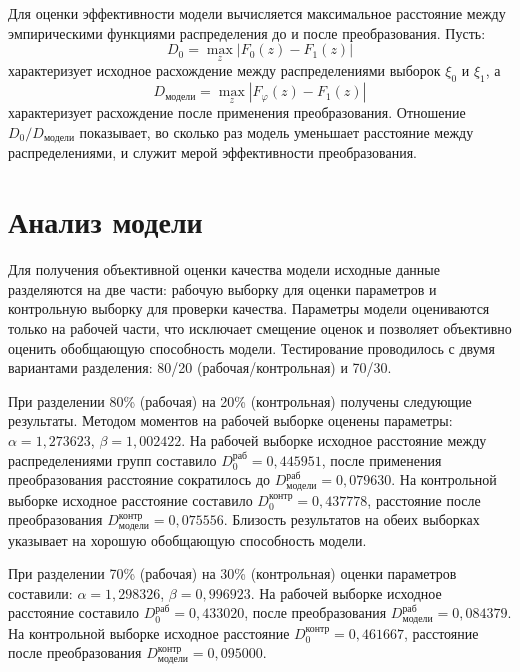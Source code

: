 \documentclass[a4paper, 14pt]{extarticle}
\begin{document}
Для оценки эффективности модели вычисляется максимальное расстояние между эмпирическими функциями распределения до и после преобразования. Пусть:
\begin{equation}
D_0 = \max_z \left| F_0(z) - F_1(z) \right|
\end{equation}
характеризует исходное расхождение между распределениями выборок $\xi_0$ и $\xi_1$, а
\begin{equation}
D_{\text{модели}} = \max_z \left| F_\varphi(z) - F_1(z) \right|
\end{equation}
характеризует расхождение после применения преобразования. Отношение $D_0 / D_{\text{модели}}$ показывает, во сколько раз модель уменьшает расстояние между распределениями, и служит мерой эффективности преобразования.

\section{Анализ модели}

Для получения объективной оценки качества модели исходные данные разделяются на две части: рабочую выборку для оценки параметров и контрольную выборку для проверки качества. Параметры модели оцениваются только на рабочей части, что исключает смещение оценок и позволяет объективно оценить обобщающую способность модели. Тестирование проводилось с двумя вариантами разделения: 80/20 (рабочая/контрольная) и 70/30.

При разделении 80\% (рабочая) на 20\% (контрольная) получены следующие результаты. Методом моментов на рабочей выборке оценены параметры: $\alpha = 1{,}273623$, $\beta = 1{,}002422$. На рабочей выборке исходное расстояние между распределениями групп составило $D_0^{\text{раб}} = 0{,}445951$, после применения преобразования расстояние сократилось до $D_{\text{модели}}^{\text{раб}} = 0{,}079630$. На контрольной выборке исходное расстояние составило $D_0^{\text{контр}} = 0{,}437778$, расстояние после преобразования $D_{\text{модели}}^{\text{контр}} = 0{,}075556$. Близость результатов на обеих выборках указывает на хорошую обобщающую способность модели.

При разделении 70\% (рабочая) на 30\% (контрольная) оценки параметров составили: $\alpha = 1{,}298326$, $\beta = 0{,}996923$. На рабочей выборке исходное расстояние составило $D_0^{\text{раб}} = 0{,}433020$, после преобразования $D_{\text{модели}}^{\text{раб}} = 0{,}084379$. На контрольной выборке исходное расстояние $D_0^{\text{контр}} = 0{,}461667$, расстояние после преобразования $D_{\text{модели}}^{\text{контр}} = 0{,}095000$. 
\end{document}

